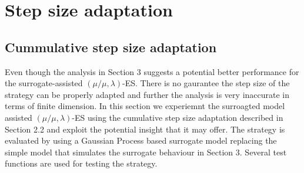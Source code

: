 










\section{Step size adaptation}

\subsection{Cummulative step size adaptation}

Even though the analysis in Section 3 suggests a potential better performance for the surrogate-assisted $(\mu/\mu,\lambda)$-ES. There is no gaurantee the step size of the strategy can be properly adapted and further the analysis is very inaccurate in terms of finite dimension. In this section we experiemnt the surroagted model assisted $(\mu/\mu,\lambda)$-ES using the cumulative step size adaptation described in Section 2.2 and exploit the potential insight that it may offer. The strategy is evaluated by using a Gaussian Process based surrogate model replacing the simple model that simulates the surrogate behaviour in Section 3. Several test functions are used for testing the strategy.

